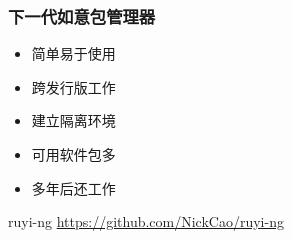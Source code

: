 \documentclass{ctexbeamer}
\begin{document}
\begin{frame}
  \frametitle{下一代如意包管理器}
  \begin{itemize}
    \item 简单易于使用 \checkmark
    \item 跨发行版工作 \checkmark
    \item 建立隔离环境 \checkmark
    \item 可用软件包多 \checkmark
    \item 多年后还工作 \checkmark
  \end{itemize}
  \begin{exampleblock}{ruyi-ng}
    \url{https://github.com/NickCao/ruyi-ng}
  \end{exampleblock}
\end{frame}
\end{document}
